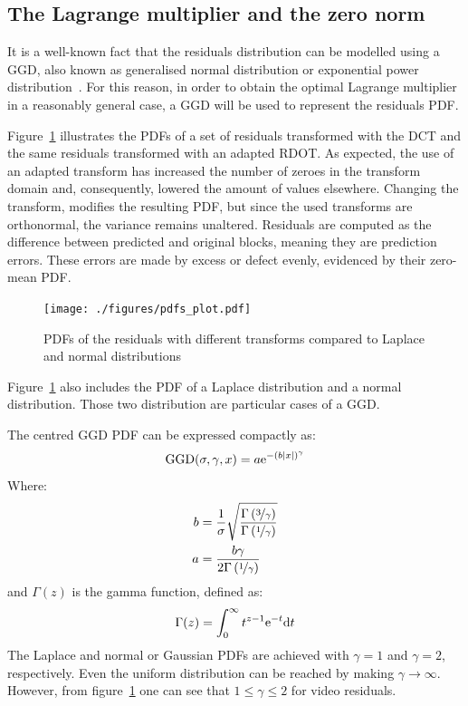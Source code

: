 \documentclass[11pt,a4paper,openright,twoside]{book}
\numberwithin{equation}{section} %
\numberwithin{figure}{section} %
\numberwithin{table}{section} %
\begin{document}
\subsection{The Lagrange multiplier and the zero norm}
\label{sub:the_lagrange_multiplier}

It is a well-known fact that the residuals distribution can be modelled
using a \ac{GGD}, also known as generalised normal distribution or
exponential power
distribution~\cite{lam-00-dct-coefficient-distribution,
yovanof-96-analysis-dct-coefficients}.
For this reason, in order to obtain the optimal Lagrange multiplier in a
reasonably general case, a \ac{GGD} will be used to represent the
residuals \ac{PDF}.

Figure~\ref{fig:probability_density_functions} illustrates the \acp{PDF}
of a set of residuals transformed with the \ac{DCT} and the same residuals
transformed with an adapted \ac{RDOT}.
As expected, the use of an adapted transform has increased the number
of zeroes in the transform domain and, consequently, lowered the amount
of values elsewhere.
Changing the transform, modifies the resulting \ac{PDF}, but
since the used transforms are orthonormal, the variance remains
unaltered.
Residuals are computed as the difference between predicted and original
blocks, meaning they are prediction errors.
These errors are made by excess or defect evenly, evidenced by their
zero-mean \ac{PDF}.
\begin{figure}[tb]
	\centering
	\texttt{[image: ./figures/pdfs\_plot.pdf]}
	\caption{\acsp{PDF} of the residuals with different transforms
	compared to Laplace and normal distributions}
	\label{fig:probability_density_functions}
\end{figure}
Figure~\ref{fig:probability_density_functions} also includes the
\ac{PDF} of a Laplace distribution and a normal distribution.
Those two distribution are particular cases of a \ac{GGD}.

The centred \ac{GGD} \ac{PDF} can be expressed compactly as:
\begin{equation}
	\text{GGD}(\sigma,\gamma,x)=
	a\text{e}^{-{\left(b\vert x \vert\right)}^\gamma}
	\label{eqn:ggd}
\end{equation}
Where:
\begin{align}
	b &= \frac{1}{\sigma}\sqrt{
	\frac{\Gamma\left(\nicefrac{3}{\gamma}\right)}
	{\Gamma \left(\nicefrac{1}{\gamma}\right)}} \\
	a &= \frac{b\gamma}{2\Gamma \left(\nicefrac{1}{\gamma}\right)}
\end{align}
and $\Gamma(z)$ is the gamma function, defined as:
\begin{equation}
	\Gamma(z) = \int_0^\infty t^{z-1}\text{e}^{-t}\text{d} t
\end{equation}
The Laplace and normal or Gaussian \acp{PDF} are achieved with
$\gamma=1$ and $\gamma=2$, respectively.
Even the uniform distribution can be reached by making $\gamma\to\infty$.
However, from figure~\ref{fig:probability_density_functions} one can see
that $1\le\gamma\le2$ for video residuals.
\end{document}
